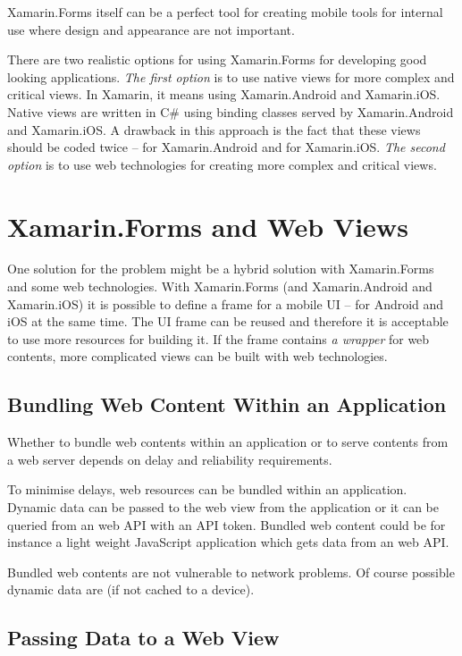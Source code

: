 \documentclass[conference]{IEEEtran}
\begin{document}
Xamarin.Forms itself can be a perfect tool for creating mobile tools for internal use where design and appearance are not important.

There are two realistic options for using Xamarin.Forms for developing good looking applications. \emph{The first option} is to use native views for more complex and critical views. In Xamarin, it means using Xamarin.Android and Xamarin.iOS. Native views are written in C\# using binding classes served by Xamarin.Android and Xamarin.iOS. A drawback in this approach is the fact that these views should be coded twice -- for Xamarin.Android and for Xamarin.iOS. \emph{The second option} is to use web technologies for creating more complex and critical views.

\section{Xamarin.Forms and Web Views}

One solution for the problem might be a hybrid solution with Xamarin.Forms and some web technologies. With Xamarin.Forms (and Xamarin.Android and Xamarin.iOS) it is possible to define a frame for a mobile UI -- for Android and iOS at the same time. The UI frame can be reused and therefore it is acceptable to use more resources for building it. If the frame contains \emph{a wrapper} for web contents, more complicated views can be built with web technologies.

\subsection{Bundling Web Content Within an Application}

Whether to bundle web contents within an application or to serve contents from a web server depends on delay and reliability requirements.

To minimise delays, web resources can be bundled within an application. Dynamic data can be passed to the web view from the application or it can be queried from an web API with an API token. Bundled web content could be for instance a light weight JavaScript application which gets data from an web API.

Bundled web contents are not vulnerable to network problems. Of course possible dynamic data are (if not cached to a device).

\subsection{Passing Data to a Web View}
\end{document}
